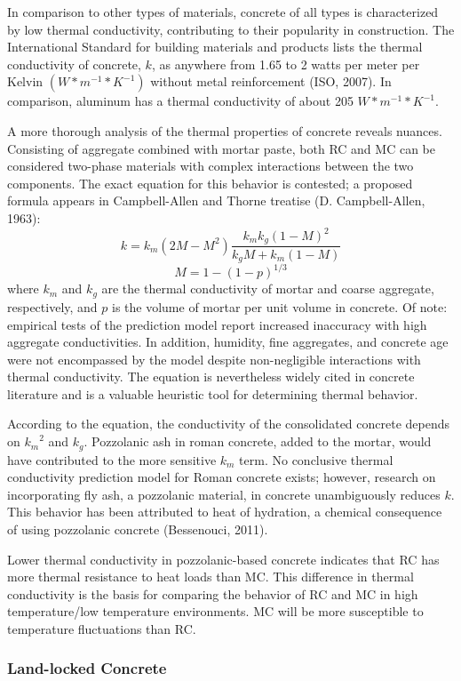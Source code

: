 \documentclass[12pt]{article}
\begin{document}
In comparison to other types of materials, concrete of all types is characterized by low thermal conductivity, contributing to their popularity in construction. The International Standard for building materials and products lists the thermal conductivity of concrete, $k$, as anywhere from 1.65 to 2 watts per meter per Kelvin $(W*m^{-1}*K^{-1})$ without metal reinforcement (ISO, 2007). In comparison, aluminum has a thermal conductivity of about 205 $W*m^{-1}*K^{-1}$.

A more thorough analysis of the thermal properties of concrete reveals nuances. Consisting of aggregate combined with mortar paste, both RC and MC can be considered two-phase materials with complex interactions between the two components. The exact equation for this behavior is contested; a proposed formula appears in Campbell-Allen and Thorne treatise (D. Campbell-Allen, 1963):
$$k = k_m (2M-M^2)\frac{k_m k_g (1-M)^2}{k_g M + k_m (1-M)}$$
$$M = 1 - (1-p)^{1/3}$$
where $k_m$ and $k_g$ are the thermal conductivity of mortar and coarse aggregate, respectively, and $p$ is the volume of mortar per unit volume in concrete.  Of note: empirical tests of the prediction model report increased inaccuracy with high aggregate conductivities. In addition, humidity, fine aggregates, and concrete age were not encompassed by the model despite non-negligible interactions with thermal conductivity. The equation is nevertheless widely cited in concrete literature and is a valuable heuristic tool for determining thermal behavior.

According to the equation, the conductivity of the consolidated concrete depends on ${k_m}^2$ and $k_g$. Pozzolanic ash in roman concrete, added to the mortar, would have contributed to the more sensitive $k_m$ term. No conclusive thermal conductivity prediction model for Roman concrete exists; however, research on incorporating fly ash, a pozzolanic material, in concrete unambiguously reduces $k$. This behavior has been attributed to heat of hydration, a chemical consequence of using pozzolanic concrete (Bessenouci, 2011).

Lower thermal conductivity in pozzolanic-based concrete indicates that RC has more thermal resistance to heat loads than MC. This difference in thermal conductivity is the basis for comparing the behavior of RC and MC in high temperature/low temperature environments. MC will be more susceptible to temperature fluctuations than RC. 

\subsubsection*{Land-locked Concrete}
\end{document}
